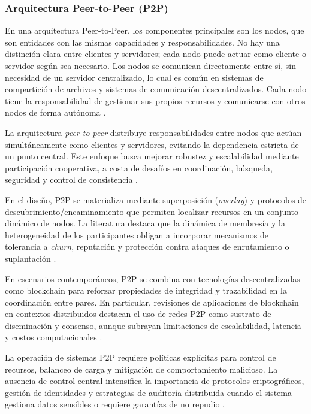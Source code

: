 			\subsubsection{Arquitectura Peer-to-Peer (P2P)}
				\noindent
				En una arquitectura Peer-to-Peer, los componentes principales son los nodos, que son entidades con las mismas capacidades y responsabilidades. No hay una distinción clara entre clientes y servidores; cada nodo puede actuar como cliente o servidor según sea necesario. Los nodos se comunican directamente entre sí, sin necesidad de un servidor centralizado, lo cual es común en sistemas de compartición de archivos y sistemas de comunicación descentralizados. Cada nodo tiene la responsabilidad de gestionar sus propios recursos y comunicarse con otros nodos de forma autónoma \cite{Yamunapeer}.
				
				La arquitectura \textit{peer-to-peer} distribuye responsabilidades entre nodos que actúan simultáneamente como clientes y servidores, evitando la dependencia estricta de un punto central. Este enfoque busca mejorar robustez y escalabilidad mediante participación cooperativa, a costa de desafíos en coordinación, búsqueda, seguridad y control de consistencia \cite{Masinde2020PeerToPeer}.
				
				En el diseño, P2P se materializa mediante superposición (\textit{overlay}) y protocolos de descubrimiento/encaminamiento que permiten localizar recursos en un conjunto dinámico de nodos. La literatura destaca que la dinámica de membresía y la heterogeneidad de los participantes obligan a incorporar mecanismos de tolerancia a \textit{churn}, reputación y protección contra ataques de enrutamiento o suplantación \cite{Masinde2020PeerToPeer}.
				
				En escenarios contemporáneos, P2P se combina con tecnologías descentralizadas como blockchain para reforzar propiedades de integridad y trazabilidad en la coordinación entre pares. En particular, revisiones de aplicaciones de blockchain en contextos distribuidos destacan el uso de redes P2P como sustrato de diseminación y consenso, aunque subrayan limitaciones de escalabilidad, latencia y costos computacionales \cite{LiuZhangHan2021P2ASurvey}.
				
				La operación de sistemas P2P requiere políticas explícitas para control de recursos, balanceo de carga y mitigación de comportamiento malicioso. La ausencia de control central intensifica la importancia de protocolos criptográficos, gestión de identidades y estrategias de auditoría distribuida cuando el sistema gestiona datos sensibles o requiere garantías de no repudio \cite{Masinde2020PeerToPeer,LiuZhangHan2021P2ASurvey}.
				

